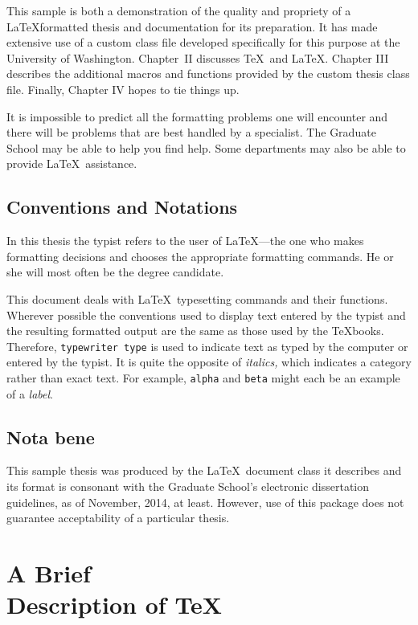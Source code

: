 \documentclass [12pt, proquest] {uwthesis}[2015/03/03]
\begin{document}
This sample is both a demonstration of the quality and
propriety of a \LaTeX formatted thesis and
documentation for its preparation.
It has made extensive use of a custom class file
developed specifically for this purpose
at the University of Washington.  Chapter~II discusses
\TeX\ and \LaTeX.
Chapter III describes the additional macros and functions
provided by the custom thesis class file.  Finally, Chapter IV hopes to tie things up.

It is
impossible to predict all the formatting problems one will encounter
and there will be problems that are best handled
by a specialist.
The Graduate School may be able to help you find help.
Some departments may also be able to provide \LaTeX\ assistance.


\section{Conventions and Notations}

In this thesis the typist
refers to the user of \LaTeX---the one who
makes formatting decisions and chooses the appropriate
formatting commands.
He or she will most often be the degree candidate.

This document deals with \LaTeX\ typesetting commands and their
functions.  Wherever possible the conventions used to display
text entered by the typist and the resulting formatted output
are the same as those used by the \TeX books.
Therefore, {\tt typewriter type} is used to indicate text
as typed by the computer
or entered by the typist.
It is quite the opposite of {\it italics,} which indicates
a category rather than exact text.  For example,
{\tt alpha} and {\tt beta} might each be an example of a {\it label}.


\section{Nota bene}

This sample thesis was produced by the \LaTeX\ document class it describes
and its format is consonant with the Graduate School's electronic dissertation guidelines,
as of November, 2014, at least.
However, use of this package does not guarantee acceptability
of a particular thesis.



\chapter{A Brief \texorpdfstring{\\}{} Description of \protect\TeX}
\end{document}
